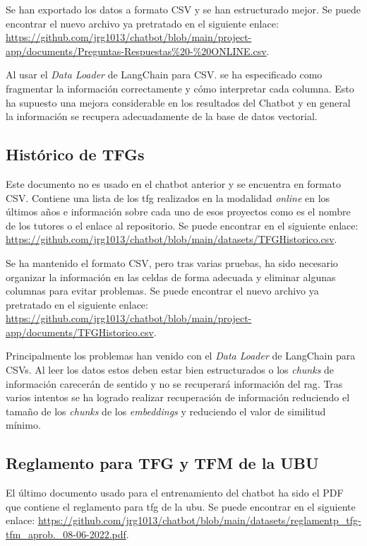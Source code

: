 Se han exportado los datos a formato CSV y se han estructurado mejor. Se puede encontrar el nuevo archivo ya pretratado en el siguiente enlace: \url{https://github.com/jrg1013/chatbot/blob/main/project-app/documents/Preguntas-Respuestas%20-%20ONLINE.csv}.

Al usar el \textit{Data Loader} de LangChain para CSV. se ha especificado como fragmentar la información correctamente y cómo interpretar cada columna. Esto ha supuesto una mejora considerable en los resultados del Chatbot y en general la información se recupera adecuadamente de la base de datos vectorial.

\subsection{Histórico de TFGs}

Este documento no es usado en el chatbot anterior y se encuentra en formato CSV. Contiene una lista de los \acrshort{tfg} realizados en la modalidad \textit{online} en los últimos años e información sobre cada uno de esos proyectos como es el nombre de los tutores o el enlace al repositorio. Se puede encontrar en el siguiente enlace: \url{https://github.com/jrg1013/chatbot/blob/main/datasets/TFGHistorico.csv}.

Se ha mantenido el formato CSV, pero tras varias pruebas, ha sido necesario organizar la información en las celdas de forma adecuada y eliminar algunas columnas para evitar problemas. Se puede encontrar el nuevo archivo ya pretratado en el siguiente enlace: \url{https://github.com/jrg1013/chatbot/blob/main/project-app/documents/TFGHistorico.csv}.

Principalmente los problemas han venido con el \textit{Data Loader} de LangChain para CSVs. Al leer los datos estos deben estar bien estructurados o los \textit{chunks} de información carecerán de sentido y no se recuperará información del \acrshort{rag}. Tras varios intentos se ha logrado realizar recuperación de información reduciendo el tamaño de los \textit{chunks} de los \textit{embeddings} y reduciendo el valor de similitud mínimo.

\subsection{Reglamento para TFG y TFM de la UBU}

El último documento usado para el entrenamiento del chatbot ha sido el PDF que contiene el reglamento para \acrshort{tfg} de la \acrshort{ubu}. Se puede encontrar en el siguiente enlace: \url{https://github.com/jrg1013/chatbot/blob/main/datasets/reglamentp_tfg-tfm_aprob._08-06-2022.pdf}.

